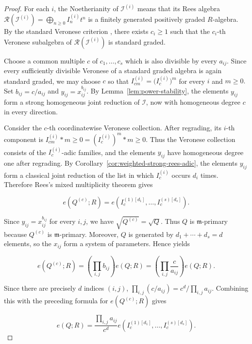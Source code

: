 \documentclass[reqno,12pt]{amsart}
\theoremstyle{plain}
\theoremstyle{definition}
\theoremstyle{remark}
\numberwithin{equation}{section}
\begin{document}
\begin{proof}
For each $i$, the Noetherianity of $\mathcal I^{(i)}$ means that its
Rees algebra
$\mathcal R(\mathcal I^{(i)})
=\bigoplus_{n\geq0}I_n^{(i)}t^n$
is a finitely generated positively graded $R$-algebra. By the standard
Veronese criterion
\cite[Theorem~2.1]{HerzogHibiTrung}, there exists $c_i\geq1$ such that
the $c_i$-th Veronese subalgebra of
$\mathcal R(\mathcal I^{(i)})$ is standard graded.

Choose a common multiple $c$ of $c_1,\ldots,c_s$ which is also divisible
by every $a_{ij}$. Since every sufficiently divisible Veronese of a
standard graded algebra is again standard graded, we may choose $c$ so
that $
I_{cm}^{(i)}=\bigl(I_c^{(i)}\bigr)^m$
for every $i$ and $m\geq0.$ Set $b_{ij}=c/a_{ij}$ and $y_{ij}=x_{ij}^{b_{ij}}$. By
Lemma~\ref{lem:power-stability}, the elements $y_{ij}$ form a strong
homogeneous joint reduction of $\boldsymbol{\mathcal I}$, now with
homogeneous degree $c$ in every direction.

Consider the $c$-th coordinatewise Veronese collection. After regrading,
its $i$-th component is
${I_{cm}^{(i)}}*{m\geq0}
={(I_c^{(i)})^m}*{m\geq0}$.
Thus the Veronese collection consists of the $I_c^{(i)}$-adic families,
and the elements $y_{ij}$ have homogeneous degree one after regrading.
By Corollary~\ref{cor:weighted-strong-rees-adic}, the elements
${y_{ij}}$ form a classical joint reduction of the list in which
$I_c^{(i)}$ occurs $d_i$ times. Therefore Rees's mixed multiplicity
theorem \cite[Theorem~17.4.9]{SwansonHuneke} gives

$$
e(Q^{(c)};R)
=
e\!\left(
I_c^{(1)[d_1]},\ldots,I_c^{(s)[d_s]}
\right).
$$

Since $y_{ij}=x_{ij}^{b_{ij}}$ for every $i,j$, we have
$\sqrt{Q^{(c)}}=\sqrt Q$. Thus $Q$ is $\mathfrak m$-primary because
$Q^{(c)}$ is $\mathfrak m$-primary. Moreover, $Q$ is generated by
$d_1+\cdots+d_s=d$ elements, so the $x_{ij}$ form a system of
parameters. Hence
\cite[Proposition~11.2.9(2)]{SwansonHuneke} yields

$$
e(Q^{(c)};R)
=
\left(\prod_{i,j}b_{ij}\right)e(Q;R)
=
\left(\prod_{i,j}\frac{c}{a_{ij}}\right)e(Q;R).
$$

Since there are precisely $d$ indices $(i,j)$,
$\prod_{i,j}(c/a_{ij})=c^d/\prod_{i,j}a_{ij}$. Combining this with the
preceding formula for $e(Q^{(c)};R)$ gives

$$
e(Q;R)
=
\frac{\prod_{i,j}a_{ij}}{c^d}
e\!\left(
I_c^{(1)[d_1]},\ldots,I_c^{(s)[d_s]}
\right).
$$


\end{proof}
\end{document}
